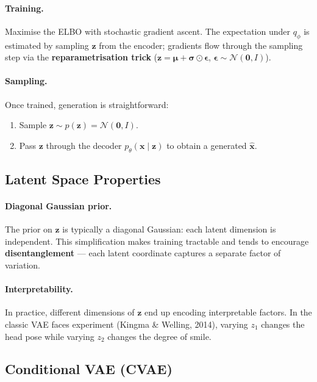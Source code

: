 \documentclass[11pt,a4paper]{article}
\theoremstyle{definition}
\theoremstyle{plain}
\theoremstyle{remark}
\begin{document}
\paragraph{Training.} Maximise the ELBO with stochastic gradient ascent. The expectation under $q_\phi$ is estimated by sampling $\mathbf{z}$ from the encoder; gradients flow through the sampling step via the \textbf{reparametrisation trick} ($\mathbf{z} = \boldsymbol{\mu} + \boldsymbol{\sigma} \odot \boldsymbol{\epsilon}$, $\boldsymbol{\epsilon} \sim \mathcal{N}(\mathbf{0}, I)$).

\paragraph{Sampling.} Once trained, generation is straightforward:
\begin{enumerate}
    \item Sample $\mathbf{z} \sim p(\mathbf{z}) = \mathcal{N}(\mathbf{0}, I)$.
    \item Pass $\mathbf{z}$ through the decoder $p_\theta(\mathbf{x}\mid\mathbf{z})$ to obtain a generated $\hat{\mathbf{x}}$.
\end{enumerate}

\subsection{Latent Space Properties}

\paragraph{Diagonal Gaussian prior.} The prior on $\mathbf{z}$ is typically a diagonal Gaussian: each latent dimension is independent. This simplification makes training tractable and tends to encourage \textbf{disentanglement} --- each latent coordinate captures a separate factor of variation.

\paragraph{Interpretability.} In practice, different dimensions of $\mathbf{z}$ end up encoding interpretable factors. In the classic VAE faces experiment (Kingma \& Welling, 2014), varying $z_1$ changes the head pose while varying $z_2$ changes the degree of smile.

\subsection{Conditional VAE (CVAE)}
\end{document}
